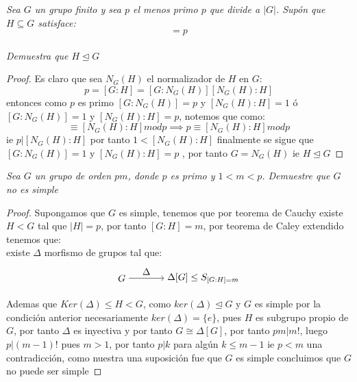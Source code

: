 \documentclass[11pt,letterpaper]{article}
\begin{document}
\begin{tcolorbox}[
	title = \textcolor{black}{\textcolor{white}{Problema 6}},]
\textit{Sea $G$ un grupo finito y sea $p$ el menos primo $p$ que divide a $|G|$. Sup\'on que $H\subseteq G$ satisface:\,\\
\begin{equation*}
    [G:H]=p
\end{equation*}\,\\
Demuestra que $H\unlhd G$
} 
\end{tcolorbox}
\begin{proof}
    Es claro que sea $N_{G}(H)$ el normalizador de $H$ en $G$:\,\\
    \begin{equation*}
        p=[G:H]=[G:N_G(H)][N_G(H):H]
    \end{equation*}
    entonces como $p$ es primo $[G:N_G(H)]=p$ y $[N_G(H):H]=1$ \'o $[G:N_G(H)]=1$ y $[N_G(H):H]=p$, notemos que como:\,\\
    \begin{equation*}
        [G:H]\equiv [N_G(H):H] mod p \implies p\equiv [N_G(H):H] mod p
    \end{equation*}
    ie $p|[N_G(H):H]$ por tanto $1<[N_G(H):H]$ finalmente se sigue que $[G:N_G(H)]=1$ y $[N_G(H):H]=p$ , por tanto $G=N_G(H)$ ie $H\unlhd G$
\end{proof}
\begin{tcolorbox}[
	title = \textcolor{black}{\textcolor{white}{Problema 7}},]
\textit{Sea $G$ un grupo de orden $pm$, donde $p$ es primo y $1<m<p$. Demuestre que $G$ no es simple
} 
\end{tcolorbox}
\begin{proof}
    Supongamos que $G$ es simple, tenemos que por teorema de Cauchy existe $H<G$ tal que $|H|=p$, por tanto $[G:H]=m$, por teorema de Caley extendido tenemos que:\,\\
    existe $\Delta$ morfismo de grupos tal que:
    \shorthandoff{<>}
\[
\begin{tikzpicture}[node distance=3cm]
  \node (A) {$G$};
  \node (B) [right of=A] {$\Delta[G]\leq S_{[G:H]=m}$};
  \draw[->] (A) -- (B) node[midway, above] {$\Delta$};
\end{tikzpicture}
\]
Ademas que $Ker(\Delta)\leq H<G$, como $ker(\Delta)\unlhd G$ y $G$ es simple por la condici\'on anterior necesariamente $ker(\Delta)=\{e\}$, pues $H$ es subgrupo propio de $G$, por tanto $\Delta$ es inyectiva y por tanto $G\cong \Delta[G]$, por tanto $pm|m!$, luego $p|(m-1)!$ pues $m>1$, por tanto $p|k$ para alg\'un $k\leq m-1$ ie $p<m$ una contradicción, como nuestra una suposici\'on fue
que $G$ es simple concluimos que $G$ no puede ser simple
\end{proof}
\end{document}
